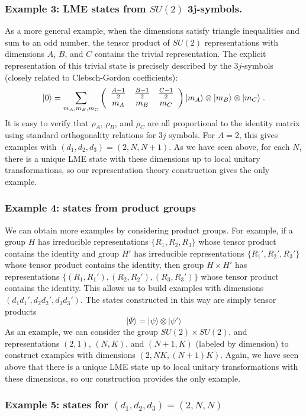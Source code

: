 \documentclass[12pt]{article}
\theoremstyle{definition}
\newcommand{\be}{\begin{equation}}
\newcommand{\ee}{\end{equation}}
\newcommand{\ba}{\begin{array}}
\newcommand{\ea}{\end{array}}
\begin{document}
\subsubsection*{Example 3: LME states from $SU(2)$ 3j-symbols.}

As a more general example, when the dimensions satisfy triangle inequalities and sum to an odd number, the tensor product of $SU(2)$ representations with dimensions $A$, $B$, and $C$ contains the trivial representation. The explicit representation of this trivial state is precisely described by the $3j$-symbols (closely related to Clebsch-Gordon coefficients):
\be
|0 \rangle =  \sum_{m_A,m_B,m_C} \left( \ba{ccc} \frac{A - 1}{2} & \frac{B - 1}{2} & \frac{C - 1}{2} \cr
m_A & m_B & m_C \ea \right) |m_A \rangle  \otimes |m_B \rangle  \otimes |m_C \rangle \; .
\ee
It is easy to verify that $\rho_A$, $\rho_B$, and $\rho_C$ are all proportional to the identity matrix using standard orthogonality relations for $3j$ symbols. For $A=2$, this gives examples with $(d_1,d_2,d_3) = (2,N,N+1)$. As we have seen above, for each $N$, there is a unique LME state with these dimensions up to local unitary transformations, so our representation theory construction gives the only example.

\subsubsection*{Example 4: states from product groups}

We can obtain more examples by considering product groups. For example, if a group $H$ has irreducible representations $\{R_1,R_2,R_3\}$ whose tensor product contains the identity and group $H'$ has irreducible representations $\{R_1',R_2',R_3'\}$ whose tensor product contains the identity, then group $H \times H'$ has representations $\{(R_1,R_1'),(R_2,R_2'),(R_3,R_3')\}$ whose tensor product contains the identity. This allows us to build examples with dimensions $(d_1 d_1',d_2 d_2', d_3 d_3')$. The states constructed in this way are simply tensor products
\be
|\Psi \rangle = |\psi \rangle  \otimes |\psi' \rangle
\ee
As an example, we can consider the group $SU(2) \times SU(2)$, and representations $(2,1)$, $(N,K)$, and $(N+1,K)$ (labeled by dimension) to construct examples with dimensions $(2,NK,(N+1)K)$. Again, we have seen above that there is a unique LME state up to local unitary transformations with these dimensions, so our construction provides the only example.

\subsubsection*{Example 5: states for $(d_1,d_2,d_3) = (2,N,N)$}
\end{document}
